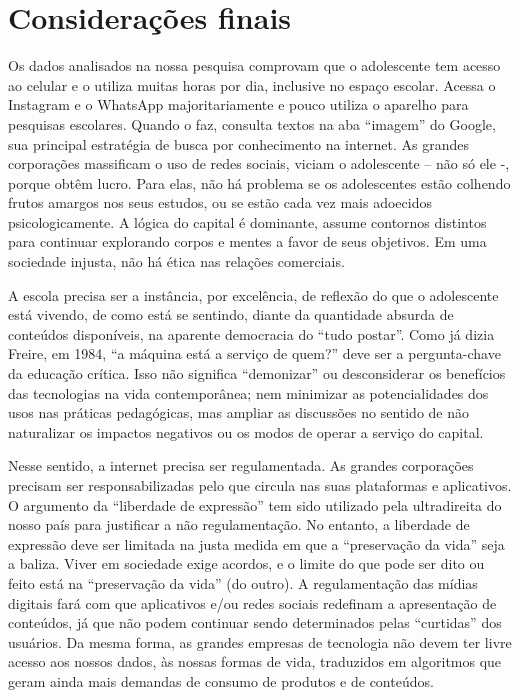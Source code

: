 \documentclass[portuguese]{textolivre}
\begin{document}
\section{Considerações finais}\label{sec-organizacao-latex}
Os dados analisados na nossa pesquisa comprovam que o adolescente tem acesso ao celular e o utiliza muitas horas por dia, inclusive no espaço escolar. Acessa o Instagram e o WhatsApp majoritariamente e pouco utiliza o aparelho para pesquisas escolares. Quando o faz, consulta textos na aba ``imagem'' do Google, sua principal estratégia de busca por conhecimento na internet. 
As grandes corporações massificam o uso de redes sociais, viciam o adolescente – não só ele -, porque obtêm lucro. Para elas, não há problema se os adolescentes estão colhendo frutos amargos nos seus estudos, ou se estão cada vez mais adoecidos psicologicamente. A lógica do capital é dominante, assume contornos distintos para continuar explorando corpos e mentes a favor de seus objetivos. Em uma sociedade injusta, não há ética nas relações comerciais.

A escola precisa ser a instância, por excelência, de reflexão do que o adolescente está vivendo, de como está se sentindo, diante da quantidade absurda de conteúdos disponíveis, na aparente democracia do ``tudo postar''. Como já dizia Freire, em 1984, ``a máquina está a serviço de quem?'' deve ser a pergunta-chave da educação crítica. Isso não significa ``demonizar'' ou desconsiderar os benefícios das tecnologias na vida contemporânea; nem minimizar as potencialidades dos usos nas práticas pedagógicas, mas ampliar as discussões no sentido de não naturalizar os impactos negativos ou os modos de operar a serviço do capital.

Nesse sentido, a internet precisa ser regulamentada. As grandes corporações precisam ser responsabilizadas pelo que circula nas suas plataformas e aplicativos. O argumento da ``liberdade de expressão'' tem sido utilizado pela ultradireita do nosso país para justificar a não regulamentação. No entanto, a liberdade de expressão deve ser limitada na justa medida em que a ``preservação da vida'' seja a baliza. Viver em sociedade exige acordos, e o limite do que pode ser dito ou feito está na ``preservação da vida'' (do outro). A regulamentação das mídias digitais fará com que aplicativos e/ou redes sociais redefinam a apresentação de conteúdos, já que não podem continuar sendo determinados pelas ``curtidas'' dos usuários. Da mesma forma, as grandes empresas de tecnologia não devem ter livre acesso aos nossos dados, às nossas formas de vida, traduzidos em algoritmos que geram ainda mais demandas de consumo de produtos e de conteúdos.
\end{document}
